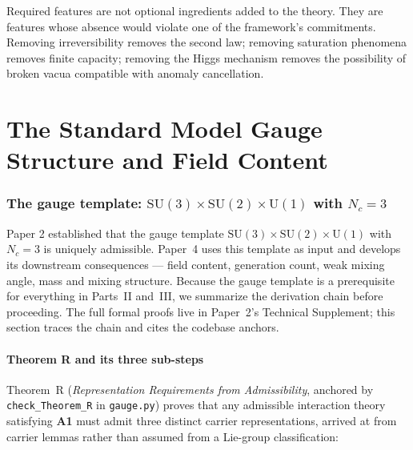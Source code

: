 \documentclass[11pt]{article}
\newcommand{\SU}{\mathrm{SU}}
\newcommand{\Un}{\mathrm{U}}
\newcommand{\Aone}{\textbf{A1}}
\theoremstyle{definition}
\begin{document}
Required features are not optional ingredients added to the theory. They are features whose absence would violate one of the framework's commitments. Removing irreversibility removes the second law; removing saturation phenomena removes finite capacity; removing the Higgs mechanism removes the possibility of broken vacua compatible with anomaly cancellation.

\clearpage

\part{The Standard Model Gauge Structure and Field Content}

\section{The gauge template: \texorpdfstring{$\SU(3)\times\SU(2)\times\Un(1)$}{SU(3) x SU(2) x U(1)} with \texorpdfstring{$N_c = 3$}{Nc = 3}}\label{sec:gauge_template}

Paper 2 established that the gauge template $\SU(3)\times\SU(2)\times\Un(1)$ with $N_c = 3$ is uniquely admissible. Paper~4 uses this template as input and develops its downstream consequences --- field content, generation count, weak mixing angle, mass and mixing structure. Because the gauge template is a prerequisite for everything in Parts~II and~III, we summarize the derivation chain before proceeding. The full formal proofs live in Paper~2's Technical Supplement; this section traces the chain and cites the codebase anchors.

\subsection{Theorem R and its three sub-steps}\label{sec:gauge_template_theoremR}

Theorem~R (\emph{Representation Requirements from Admissibility}, anchored by \texttt{check\_Theorem\_R} in \texttt{gauge.py}) proves that any admissible interaction theory satisfying \Aone{} must admit three distinct carrier representations, arrived at from carrier lemmas rather than assumed from a Lie-group classification:
\end{document}
